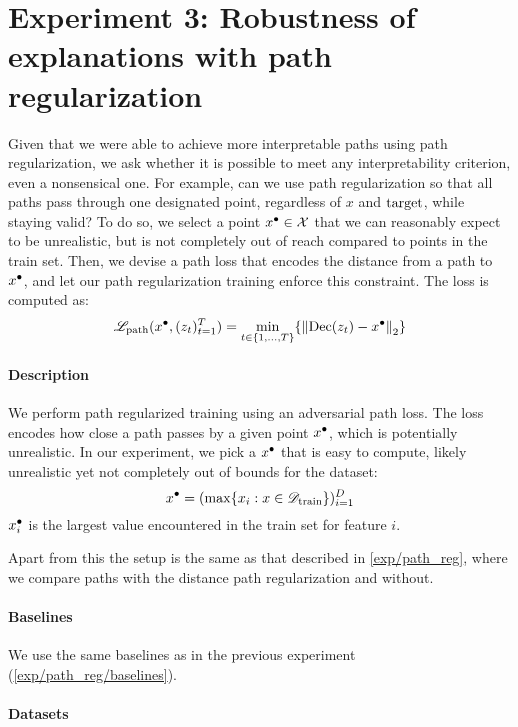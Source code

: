\documentclass[../main.tex]{subfiles}
\begin{document}
\section{Experiment 3: Robustness of explanations with path regularization}

Given that we were able to achieve more interpretable paths using path regularization, we ask whether it is possible to meet any interpretability criterion, even a nonsensical one.
For example, can we use path regularization so that all paths pass through one designated point, regardless of $x$ and $\mathrm{target}$, while staying valid?
To do so, we select a point $x^\bullet \in \mathcal{X}$ that we can reasonably expect to be unrealistic, but is not completely out of reach compared to points in the train set.
Then, we devise a path loss that encodes the distance from a path to $x^\bullet$, and let our path regularization training enforce this constraint.
The loss is computed as:
\begin{align*}
    \mathscr{L}_\text{path}(x^\bullet, (z_t)_{t=1}^T) = \min_{t \in \{1, \ldots, T\}} \{ \left\lVert\operatorname{Dec}(z_t) - x^\bullet\right\rVert_2 \}
\end{align*}

\paragraph{Description}

We perform path regularized training using an adversarial path loss.
The loss encodes how close a path passes by a given point $x^\bullet$, which is potentially unrealistic.
In our experiment, we pick a $x^\bullet$ that is easy to compute, likely unrealistic yet not completely out of bounds for the dataset:
\begin{equation}
    x^\bullet = (\max\{ x_i : x \in \mathscr{D}_\text{train} \})_{i=1}^D
\end{equation}
\ie{} $x^\bullet_i$ is the largest value encountered in the train set for feature $i$.

Apart from this the setup is the same as that described in \autoref{exp/path_reg}, where we compare paths with the distance path regularization and without.

\paragraph{Baselines}

We use the same baselines as in the previous experiment (\autoref{exp/path_reg/baselines}).

\paragraph{Datasets}
\end{document}
